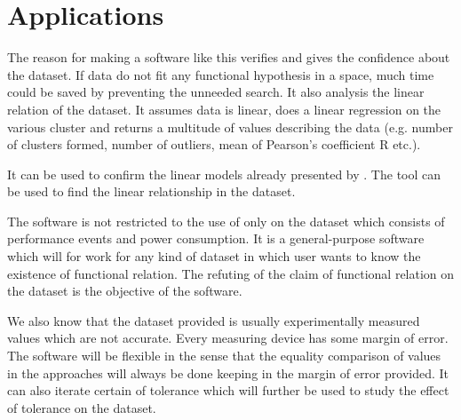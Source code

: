 \section{Applications}

The reason for making a software like this verifies and gives the confidence about the dataset. If data do not fit any functional hypothesis in a space, much time could be saved by preventing the unneeded search. It also analysis the linear relation of the dataset. It assumes data is linear, does a linear regression on the various cluster and returns a multitude of values describing the data (e.g. number of clusters formed, number of outliers, mean of Pearson's coefficient R etc.).

It can be used to confirm the linear models already presented by \cite{bircher2007complete}\cite{bellosa2000benefits}\cite{o2017survey}. The tool can be used to find the linear relationship in the dataset. 

The software is not restricted to the use of only on the dataset which consists of performance events and power consumption. It is a general-purpose software which will for work for any kind of dataset in which user wants to know the existence of functional relation. The refuting of the claim of functional relation on the dataset is the objective of the software.

We also know that the dataset provided is usually experimentally measured values which are not accurate. Every measuring device has some margin of error. The software will be flexible in the sense that the equality comparison of values in the approaches will always be done keeping in the margin of error provided. It can also iterate certain of tolerance which will further be used to study the effect of tolerance on the dataset.

